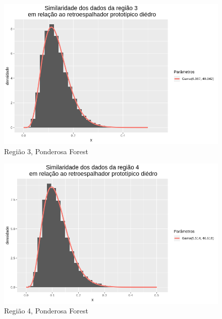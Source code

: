 \documentclass[12pt]{article}
\begin{document}
\begin{figure}[!h]
    \centering
    \vspace{0.1\linewidth}
    \includegraphics[width = \linewidth]{../../Images/Report_18_12_20/ponder_di_region3.png}
    \caption{Região 3, Ponderosa Forest}
    \label{fig:pond_di_r3}
\end{figure}

\begin{figure}[!h]
    \centering
    \vspace{0.1\linewidth}
    \includegraphics[width = \linewidth]{../../Images/Report_18_12_20/ponder_di_region4.png}
    \caption{Região 4, Ponderosa Forest}
    \label{fig:pond_di_r4}
\end{figure}
\end{document}

